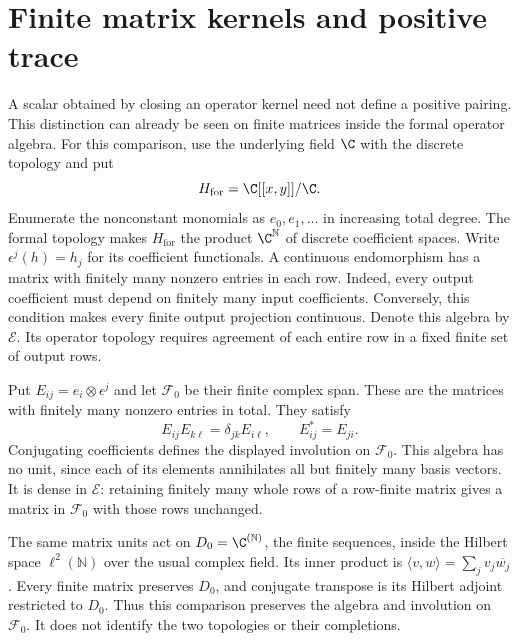 \section{Finite matrix kernels and positive trace}
\label{sec:weil-formal-kernels}

A scalar obtained by closing an operator kernel need not define a
positive pairing.  This distinction can already be seen on finite
matrices inside the formal operator algebra.
For this comparison, use the underlying field $\C$ with the discrete
topology and put
\[
 H_{\mathrm{for}}=\C[[x,y]]/\C.
\]
Enumerate the nonconstant monomials as $e_0,e_1,\ldots$ in increasing
total degree.  The formal topology makes $H_{\mathrm{for}}$ the product
$\C^{\mathbb N}$ of discrete coefficient spaces.  Write
$\epsilon^j(h)=h_j$ for its coefficient functionals.
A continuous endomorphism has a matrix with finitely many nonzero entries
in each row.  Indeed, every output coefficient must depend on finitely
many input coefficients.  Conversely, this condition makes every finite
output projection continuous.  Denote this algebra by $\mathscr E$.
Its operator topology requires agreement of each entire row in a fixed
finite set of output rows.

Put $E_{ij}=e_i\otimes\epsilon^j$ and let $\mathscr F_0$ be their
finite complex span.  These are the matrices with finitely many nonzero
entries in total.  They satisfy
\[
 E_{ij}E_{k\ell}=\delta_{jk}E_{i\ell},\qquad
 E_{ij}^*=E_{ji}.
\]
Conjugating coefficients defines the displayed involution on
$\mathscr F_0$.  This algebra has no unit, since each of its elements
annihilates all but finitely many basis vectors.
It is dense in $\mathscr E$: retaining finitely many whole rows of a
row-finite matrix gives a matrix in $\mathscr F_0$ with those rows unchanged.

The same matrix units act on $D_0=\C^{(\mathbb N)}$, the finite sequences,
inside the Hilbert space $\ell^2(\mathbb N)$ over the usual complex field.
Its inner product is $\langle v,w\rangle=\sum_jv_j\overline{w_j}$.
Every finite matrix preserves $D_0$, and conjugate transpose is its
Hilbert adjoint restricted to $D_0$.  Thus this comparison preserves the
algebra and involution on $\mathscr F_0$.  It does not identify the two
topologies or their completions.

